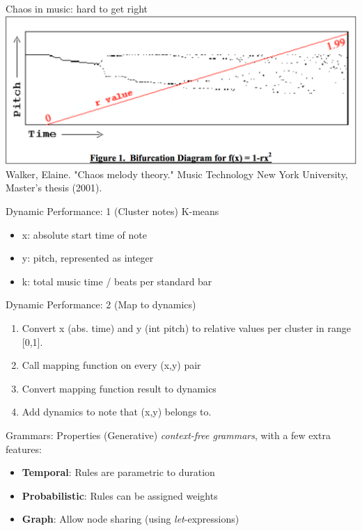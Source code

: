 \documentclass{beamer}
\begin{document}
        \begin{frame}{Chaos in music: hard to get right}
                  \includegraphics[width=1\textwidth]{figures/chaos.png}\\
                  Walker, Elaine. "Chaos melody theory." Music Technology New York University, Master's thesis (2001).
        \end{frame}

        \begin{frame}{Dynamic Performance: 1 (Cluster notes)}
                    K-means
                    \begin{itemize}
                    \item x: absolute start time of note
                    \item y: pitch, represented as integer
                    \item k: total music time / beats per standard bar
                    \end{itemize}
        \end{frame}
        
        \begin{frame}{Dynamic Performance: 2 (Map to dynamics)}
                    \begin{enumerate}
                    \item	Convert x (abs. time) and y (int pitch) to relative values per cluster in range [0,1].
                    \item Call mapping function on every (x,y) pair
                    \item Convert mapping function result to dynamics
                    \item Add dynamics to note that (x,y) belongs to.
                    \end{enumerate}
        \end{frame}


	\begin{frame}[fragile=singleslide]{Grammars: Properties}
    (Generative) \textit{context-free grammars}, with a few extra features:
	\begin{itemize}
	\item \textbf{Temporal}: Rules are parametric to duration
	\item \textbf{Probabilistic}: Rules can be assigned weights
	\item \textbf{Graph}: Allow node sharing (using \textit{let}-expressions)
	\end{itemize}
	\end{frame}
	
\end{document}
